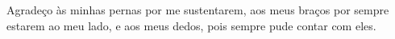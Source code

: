 {\fontsize{12pt}{12pt}\selectfont %
\renewcommand{\agradecimentosname}{\textbf{\fontsize{12pt}{12pt}\selectfont AGRADECIMENTOS}} %

\begin{agradecimentos}
    Agradeço às minhas pernas por me sustentarem, aos meus braços por sempre estarem ao meu lado, e aos meus dedos, pois sempre pude contar com eles.
\end{agradecimentos}}
\newpage